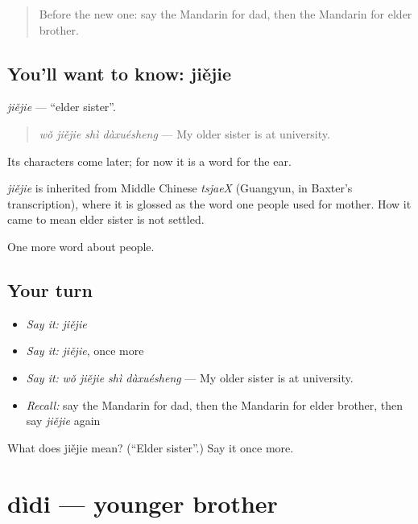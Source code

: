 \begin{quote}
Before the new one: say the Mandarin for dad, then the Mandarin for elder brother.
\end{quote}

\subsection*{You'll want to know: jiějie}
\emph{jiějie} — \textquotedblleft{}elder sister\textquotedblright{}.

\begin{quote}
\emph{wǒ jiějie shì dàxuésheng} — My older sister is at university.
\end{quote}

Its characters come later; for now it is a word for the ear.

\begin{cousinweb}
\emph{jiějie} is inherited from Middle Chinese \emph{tsjaeX} (Guangyun, in Baxter's transcription), where it is glossed as the word one people used for mother. How it came to mean elder sister is not settled.
\end{cousinweb}

\begin{grammarlens}[title={What you've built}]
One more word about people.
\end{grammarlens}

\subsection*{Your turn}
\begin{itemize}
\raggedright
  \item \emph{Say it:} \emph{jiějie}
  \item \emph{Say it:} \emph{jiějie}, once more
  \item \emph{Say it:} \emph{wǒ jiějie shì dàxuésheng} — My older sister is at university.
  \item \emph{Recall:} say the Mandarin for dad, then the Mandarin for elder brother, then say \emph{jiějie} again
\end{itemize}

\begin{tcolorbox}[breakable,colback=teal!4,colframe=teal!35!black,title={Before you move on}]
What does jiějie mean? (\textquotedblleft{}Elder sister\textquotedblright{}.) Say it once more.
\end{tcolorbox}
\section[dìdi]{dìdi — younger brother}

